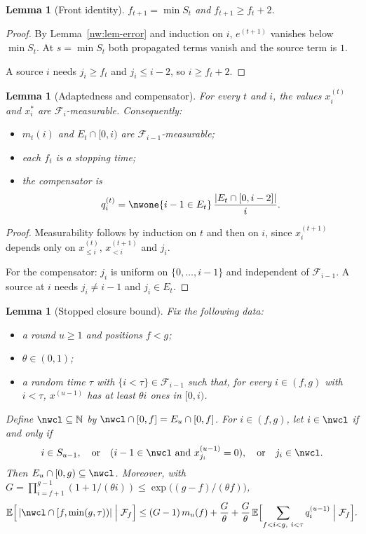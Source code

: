 \documentclass[11pt]{amsart}
\newtheorem{lemma}[theorem]{Lemma}
\theoremstyle{definition}
\theoremstyle{remark}
\newcommand{\EE}{\mathbb{E}}
\newcommand{\cF}{\mathcal{F}}
\begin{document}
\begin{lemma}[Front identity]\label{nw:lem-front}
$f_{t+1}=\min S_t$ and $f_{t+1}\ge f_t+2$.
\end{lemma}

\begin{proof}
By Lemma~\ref{nw:lem-error} and induction on $i$, $e^{(t+1)}$ vanishes below
$\min S_t$. At $s=\min S_t$ both propagated terms vanish and the source term
is $1$.

A source $i$ needs $j_i\ge f_t$ and $j_i\le i-2$, so $i\ge f_t+2$.
\end{proof}

\begin{lemma}[Adaptedness and compensator]\label{nw:lem-adapted}
For every $t$ and $i$, the values $x^{(t)}_i$ and $x^*_i$ are
$\cF_i$-measurable. Consequently:
\begin{itemize}[leftmargin=*]
\item $m_t(i)$ and $E_t\cap[0,i)$ are $\cF_{i-1}$-measurable;
\item each $f_t$ is a stopping time;
\item the compensator is
  \[
    q^{(t)}_i=\nwone\{i-1\in E_t\}\,\frac{|E_t\cap[0,i-2]|}{i}.
  \]
\end{itemize}
\end{lemma}

\begin{proof}
Measurability follows by induction on $t$ and then on $i$, since
$x^{(t+1)}_i$ depends only on $x^{(t)}_{\le i}$, $x^{(t+1)}_{<i}$ and $j_i$.

For the compensator: $j_i$ is uniform on $\{0,\dots,i-1\}$ and independent of
$\cF_{i-1}$. A source at $i$ needs $j_i\ne i-1$ and $j_i\in E_t$.
\end{proof}

\begin{lemma}[Stopped closure bound]\label{nw:lem-closure}
Fix the following data:
\begin{itemize}[leftmargin=*]
\item a round $u\ge1$ and positions $f<g$;
\item $\theta\in(0,1)$;
\item a random time $\tau$ with $\{i<\tau\}\in\cF_{i-1}$ such that, for every
  $i\in(f,g)$ with $i<\tau$, $x^{(u-1)}$ has at least $\theta i$ ones in
  $[0,i)$.
\end{itemize}
Define $\nwcl\subseteq\mathbb N$ by $\nwcl\cap[0,f]=E_u\cap[0,f]$. For
$i\in(f,g)$, let $i\in\nwcl$ if and only if
\[
  i\in S_{u-1},\quad\text{or}\quad(i-1\in\nwcl\text{ and }x^{(u-1)}_{j_i}=0),
  \quad\text{or}\quad j_i\in\nwcl.
\]
Then $E_u\cap[0,g)\subseteq\nwcl$. Moreover, with
$G=\prod_{i=f+1}^{g-1}(1+1/(\theta i))\le\exp\bigl((g-f)/(\theta f)\bigr)$,
\[
  \EE\Bigl[\,|\nwcl\cap[f,\min(g,\tau))|\Bigm|\cF_f\Bigr]
  \le(G-1)\,m_u(f)+\frac G\theta
  +\frac G\theta\,\EE\Bigl[\sum_{f<i<g,\ i<\tau}q^{(u-1)}_i\Bigm|\cF_f\Bigr].
\]
\end{lemma}
\end{document}
